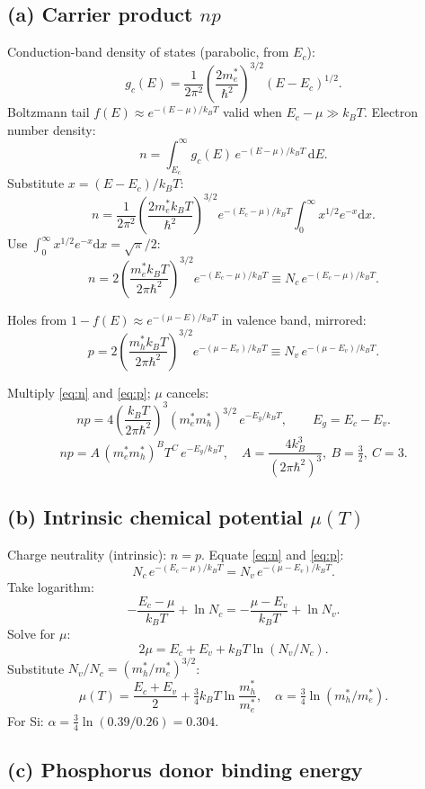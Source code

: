 \documentclass[11pt]{article}
\newcommand{\de}{\mathrm{d}}
\begin{document}
\subsection*{(a) Carrier product $np$}

Conduction-band density of states (parabolic, from $E_{c}$):
\[ g_{c}(E) = \frac{1}{2\pi^{2}}\!\left(\frac{2m_{e}^{*}}{\hbar^{2}}\right)^{\!3/2}\!(E-E_{c})^{1/2}. \]
Boltzmann tail $f(E)\approx e^{-(E-\mu)/k_{B}T}$ valid when $E_{c}-\mu\gg k_{B}T$. Electron number density:
\[ n = \int_{E_{c}}^{\infty}\! g_{c}(E)\,e^{-(E-\mu)/k_{B}T}\,\de E. \]
Substitute $x=(E-E_{c})/k_{B}T$:
\[ n = \frac{1}{2\pi^{2}}\!\left(\frac{2m_{e}^{*}k_{B}T}{\hbar^{2}}\right)^{\!3/2}\!e^{-(E_{c}-\mu)/k_{B}T}\!\int_{0}^{\infty}\!\!x^{1/2}e^{-x}\de x. \]
Use $\int_{0}^{\infty}x^{1/2}e^{-x}\de x=\sqrt\pi/2$:
\[ n = 2\!\left(\frac{m_{e}^{*}k_{B}T}{2\pi\hbar^{2}}\right)^{\!3/2}\!e^{-(E_{c}-\mu)/k_{B}T} \equiv N_{c}\,e^{-(E_{c}-\mu)/k_{B}T}. \label{eq:n} \]

Holes from $1-f(E)\approx e^{-(\mu-E)/k_{B}T}$ in valence band, mirrored:
\[ p = 2\!\left(\frac{m_{h}^{*}k_{B}T}{2\pi\hbar^{2}}\right)^{\!3/2}\!e^{-(\mu-E_{v})/k_{B}T} \equiv N_{v}\,e^{-(\mu-E_{v})/k_{B}T}. \label{eq:p} \]

Multiply \eqref{eq:n} and \eqref{eq:p}; $\mu$ cancels:
\[ np = 4\!\left(\frac{k_{B}T}{2\pi\hbar^{2}}\right)^{\!3}\!(m_{e}^{*}m_{h}^{*})^{3/2}\,e^{-E_{g}/k_{B}T},\qquad E_{g}=E_{c}-E_{v}. \]
\[ \boxed{\;np = A\,(m_{e}^{*}m_{h}^{*})^{B}T^{C}\,e^{-E_{g}/k_{B}T},\quad A=\frac{4 k_{B}^{3}}{(2\pi\hbar^{2})^{3}},\ B=\tfrac32,\ C=3.\;} \]

\subsection*{(b) Intrinsic chemical potential $\mu(T)$}

Charge neutrality (intrinsic): $n=p$. Equate \eqref{eq:n} and \eqref{eq:p}:
\[ N_{c}\,e^{-(E_{c}-\mu)/k_{B}T} = N_{v}\,e^{-(\mu-E_{v})/k_{B}T}. \]
Take logarithm:
\[ -\frac{E_{c}-\mu}{k_{B}T}+\ln N_{c} = -\frac{\mu-E_{v}}{k_{B}T}+\ln N_{v}. \]
Solve for $\mu$:
\[ 2\mu = E_{c}+E_{v} + k_{B}T\ln(N_{v}/N_{c}). \]
Substitute $N_{v}/N_{c}=(m_{h}^{*}/m_{e}^{*})^{3/2}$:
\[ \boxed{\;\mu(T) = \frac{E_{c}+E_{v}}{2} + \tfrac{3}{4}k_{B}T\ln\!\frac{m_{h}^{*}}{m_{e}^{*}},\quad \alpha=\tfrac{3}{4}\ln(m_{h}^{*}/m_{e}^{*}).\;} \]
For Si: $\alpha=\tfrac34\ln(0.39/0.26)=0.304$.

\subsection*{(c) Phosphorus donor binding energy}
\end{document}
